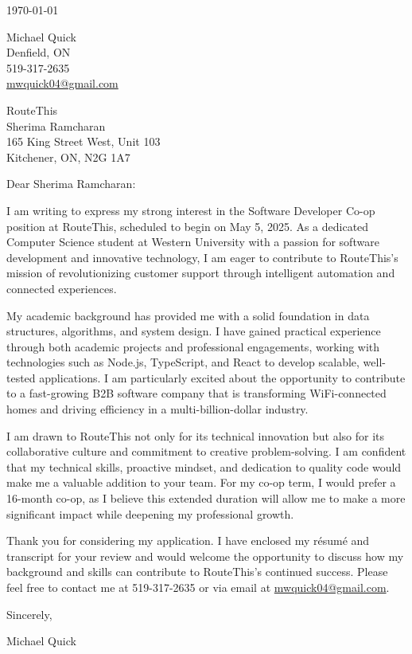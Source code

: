 \documentclass[11pt]{article}
\begin{document}
\begin{flushright}
\today
\end{flushright}

\noindent Michael Quick \\
Denfield, ON \\
519-317-2635 \\
\href{mailto:mwquick04@gmail.com}{mwquick04@gmail.com} \\

\vspace{1em}

\noindent RouteThis \\
Sherima Ramcharan \\
165 King Street West, Unit 103 \\
Kitchener, ON, N2G 1A7

\vspace{1em}

\noindent Dear Sherima Ramcharan:

\setlength{\parindent}{15pt}
\setlength{\parskip}{0.75em}

I am writing to express my strong interest in the Software Developer Co-op position at RouteThis, scheduled to begin on May 5, 2025. As a dedicated Computer Science student at Western University with a passion for software development and innovative technology, I am eager to contribute to RouteThis’s mission of revolutionizing customer support through intelligent automation and connected experiences.

My academic background has provided me with a solid foundation in data structures, algorithms, and system design. I have gained practical experience through both academic projects and professional engagements, working with technologies such as Node.js, TypeScript, and React to develop scalable, well-tested applications. I am particularly excited about the opportunity to contribute to a fast-growing B2B software company that is transforming WiFi-connected homes and driving efficiency in a multi-billion-dollar industry.

I am drawn to RouteThis not only for its technical innovation but also for its collaborative culture and commitment to creative problem-solving. I am confident that my technical skills, proactive mindset, and dedication to quality code would make me a valuable addition to your team. For my co-op term, I would prefer a 16-month co-op, as I believe this extended duration will allow me to make a more significant impact while deepening my professional growth.

Thank you for considering my application. I have enclosed my résumé and transcript for your review and would welcome the opportunity to discuss how my background and skills can contribute to RouteThis’s continued success. Please feel free to contact me at 519-317-2635 or via email at \href{mailto:mwquick04@gmail.com}{mwquick04@gmail.com}.

\setlength{\parindent}{0pt}

\vspace{1em}
Sincerely,

\vspace{1em}
Michael Quick
\end{document}
